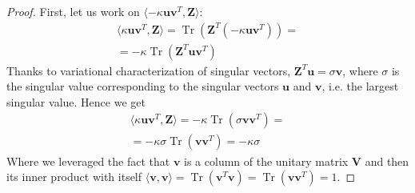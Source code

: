 \documentclass[12pt]{article}
\DeclareMathOperator*{\tr}{Tr}
\newcommand{\boldZ}{\mathbf{Z}}
\newcommand{\boldV}{\mathbf{V}}
\newcommand{\boldu}{\mathbf{u}}
\newcommand{\boldv}{\mathbf{v}}
\begin{document}
\begin{proof}
First, let us work on $\langle -\kappa \boldu \boldv^T, \boldZ \rangle$:
\begin{gather}
    \langle \kappa \boldu \boldv^T, \boldZ \rangle = \tr(\boldZ^T (-\kappa \boldu \boldv^T)) = \\
    = -\kappa \tr(\boldZ^T \boldu \boldv^T)
\end{gather}
Thanks to variational characterization of singular vectors, $\boldZ^T \boldu = \sigma \boldv$, where $\sigma$ is the singular value corresponding to the singular vectors $\boldu$ and $\boldv$, i.e. the largest singular value. Hence we get
\begin{gather}
    \langle \kappa \boldu \boldv^T, \boldZ \rangle = -\kappa \tr(\sigma \boldv \boldv^T) = \\
    = -\kappa \sigma \tr(\boldv \boldv^T) = -\kappa \sigma \label{eq:inner-kuv-z}
\end{gather}
Where we leveraged the fact that $\boldv$ is a column of the unitary matrix $\boldV$ and then its inner product with itself $\langle \boldv, \boldv \rangle = \tr(\boldv^T\boldv) = \tr(\boldv\boldv^T) = 1$.


\end{proof}
\end{document}
